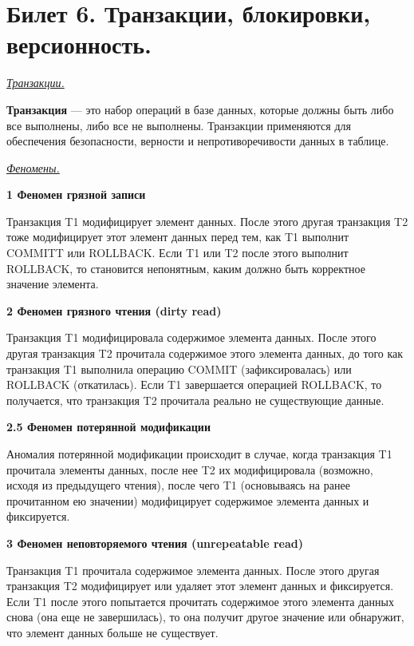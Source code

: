 \newpage
\section {Билет 6. Транзакции, блокировки, версионность.}

\begin{center}
\textit{\underline{Транзакции.}}
\end{center}

\textbf{Транзакция} — это набор операций в базе данных, которые должны быть либо все выполнены, либо все не выполнены. Транзакции применяются для обеспечения безопасности, верности и непротиворечивости данных в таблице.

\begin{center}
\textit{\underline{Феномены.}}
\end{center}

\textbf{1 Феномен грязной записи}

Транзакция T1 модифицирует элемент данных. После этого другая транзакция T2 тоже модифицирует этот элемент данных перед тем, как T1 выполнит COMMITT или ROLLBACK. Если T1 или T2 после этого выполнит ROLLBACK, то становится непонятным, каким должно быть корректное значение элемента.

\textbf{2 Феномен грязного чтения (dirty read)}

Транзакция T1 модифицировала содержимое элемента данных. После этого другая транзакция T2 прочитала содержимое этого элемента данных, до того как транзакция T1 выполнила операцию COMMIT (зафиксировалась) или ROLLBACK (откатилась). Если T1 завершается операцией ROLLBACK, то получается, что транзакция T2 прочитала реально не существующие данные.


\textbf{2.5 Феномен потерянной модификации}

Аномалия потерянной модификации происходит в случае, когда транзакция T1 прочитала элементы данных, после нее T2 их модифицировала (возможно, исходя из предыдущего чтения), после чего T1 (основываясь на ранее прочитанном ею значении) модифицирует содержимое элемента данных и фиксируется.

\textbf{3 Феномен неповторяемого чтения (unrepeatable read)}

Транзакция T1 прочитала содержимое элемента данных. После этого другая транзакция T2 модифицирует или удаляет этот элемент данных и фиксируется. Если T1 после этого попытается прочитать содержимое этого элемента данных снова (она еще не завершилась), то она получит другое значение или обнаружит, что элемент данных больше не существует.

